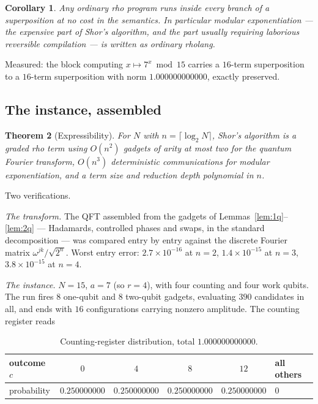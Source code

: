 \documentclass[11pt,a4paper]{article}
\theoremstyle{plain}
\newtheorem{theorem}{Theorem}[section]
\newtheorem{corollary}[theorem]{Corollary}
\theoremstyle{definition}
\theoremstyle{remark}
\begin{document}
\begin{corollary}\label{cor:modexp}
Any ordinary rho program runs inside every branch of a superposition at no cost
in the semantics. In particular modular exponentiation --- the expensive part of
Shor's algorithm, and the part usually requiring laborious reversible
compilation --- is written as ordinary rholang.
\end{corollary}

Measured: the block computing $x \mapsto 7^x \bmod 15$ carries a $16$-term
superposition to a $16$-term superposition with norm $1.000000000000$, exactly
preserved.

\subsection{The instance, assembled}

\begin{theorem}[Expressibility]\label{thm:shor}
For $N$ with $n = \lceil \log_2 N\rceil$, Shor's algorithm is a graded rho term
using $O(n^2)$ gadgets of arity at most two for the quantum Fourier transform,
$O(n^3)$ deterministic communications for modular exponentiation, and a term
size and reduction depth polynomial in $n$.
\end{theorem}

Two verifications.

\emph{The transform.} The QFT assembled from the gadgets of
Lemmas~\ref{lem:1q}--\ref{lem:2q} --- Hadamards, controlled phases and swaps, in
the standard decomposition --- was compared entry by entry against the discrete
Fourier matrix $\omega^{jk}/\sqrt{2^n}$. Worst entry error: $2.7\times 10^{-16}$
at $n=2$, $1.4\times 10^{-15}$ at $n=3$, $3.8\times 10^{-15}$ at $n=4$.

\emph{The instance.} $N=15$, $a=7$ (so $r=4$), with four counting and four work
qubits. The run fires $8$ one-qubit and $8$ two-qubit gadgets, evaluating $390$
candidates in all, and ends with $16$ configurations carrying nonzero amplitude.
The counting register reads

\begin{table}[h]
\centering
\small
\begin{tabular}{@{}lccccl@{}}
\toprule
outcome $c$ & $0$ & $4$ & $8$ & $12$ & all others \\
\midrule
probability & $0.250000000$ & $0.250000000$ & $0.250000000$ & $0.250000000$ & $0$ \\
\bottomrule
\end{tabular}
\caption{Counting-register distribution, total $1.000000000000$.}\label{tab:shor}
\end{table}
\end{document}

